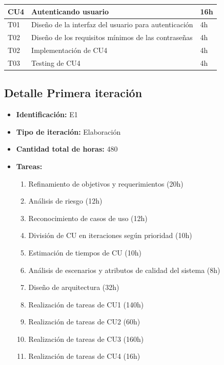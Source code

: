 \documentclass[a4paper, 10pt, twoside]{article}
\begin{document}
\begin{tabular}{lp{13cm}l}
  \hline
  CU4 & Autenticando usuario & 16h \\
  \hline
  T01 & Diseño de la interfaz del usuario para autenticación & 4h \\
  T02 & Diseño de los requisitos mínimos de las contraseñas & 4h \\
  T02 & Implementación de CU4 & 4h \\
  T03 & Testing de CU4 & 4h \\
  \hline
\end{tabular}


\subsection{Detalle Primera iteración}

\begin{itemize}
  \item \textbf{Identificación:} E1
  \item \textbf{Tipo de iteración:} Elaboración
  \item \textbf{Cantidad total de horas:} 480
  \item \textbf{Tareas:}
\begin{enumerate}
  \item Refinamiento de objetivos y requerimientos (20h)
  \item Análisis de riesgo (12h)
  \item Reconocimiento de casos de uso (12h)
  \item División de CU en iteraciones según prioridad (10h)
  \item Estimación de tiempos de CU (10h)
  \item Análisis de escenarios y atributos de calidad del sistema (8h)
  \item Diseño de arquitectura (32h)
  \item Realización de tareas de CU1 (140h)
  \item Realización de tareas de CU2 (60h)
  \item Realización de tareas de CU3 (160h)
  \item Realización de tareas de CU4 (16h)
\end{enumerate}
\end{itemize}
\end{document}
